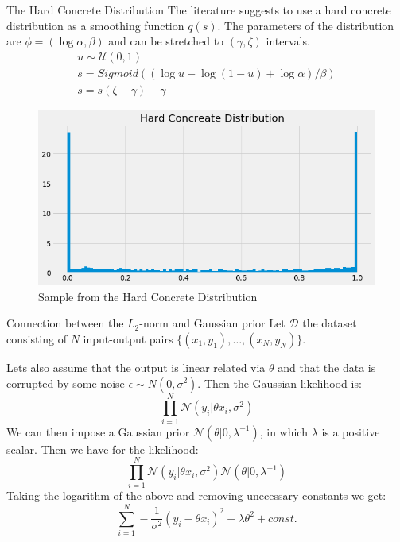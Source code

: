 \documentclass{beamer}
\begin{document}
\begin{frame}[t]{The Hard Concrete Distribution}
  The literature suggests to use a hard concrete distribution as a smoothing function $q(s)$. 
  The parameters of the distribution are $\phi = (\log \alpha, \beta)$ and can be stretched to $(\gamma, \zeta)$ intervals.
  \begin{equation}
    \begin{align*}
      u \sim \mathcal{U}(0,1) \\
      s = Sigmoid((\log u - \log(1-u) + \log\alpha)/\beta) \\
      \bar{s} = s(\zeta - \gamma) + \gamma 
    \end{align*}
  \end{equation}
  \begin{figure}[htpb]
    \centering
    \includegraphics[width=0.5\linewidth]{hard_concrete.png}
    \caption{Sample from the Hard Concrete Distribution}\label{fig:hard_concrete}
  \end{figure} 
\end{frame}

\begin{frame}[t]{Connection between the $L_2$-norm and Gaussian prior}
  \small
  Let $\mathcal{D}$ the dataset consisting of $N$ input-output pairs $\{(x_1, y_1), \ldots, (x_N, y_N)\}$.

  Lets also assume that the output is linear related via $\theta$ and that the data is corrupted by some noise $\epsilon\sim N(0, \sigma^2)$.
  Then the Gaussian likelihood is:
  \begin{equation}
    \prod^N_{i=1} \mathcal{N}(y_i|\theta x_i, \sigma^2)
  \end{equation}
  We can then impose a Gaussian prior $\mathcal{N}(\theta|0, \lambda^{-1})$, in which $\lambda$ is a positive scalar.
  Then we have for the likelihood:
  \begin{equation}
    \prod^N_{i=1} \mathcal{N}(y_i|\theta x_i, \sigma^2)\mathcal{N}(\theta|0, \lambda^{-1})
  \end{equation}
  Taking the logarithm of the above and removing unecessary constants we get:
  \begin{equation}
    \sum^N_{i=1} - \frac{1}{\sigma^2} (y_i - \theta x_i)^2 - \lambda \theta^2 + const.
  \end{equation}
\end{frame}
\end{document}
